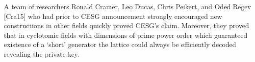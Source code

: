 A team of researchers Ronald Cramer, Leo Ducas, Chris Peikert, and Oded Regev [Cra15] who had prior to CESG announcement strongly encouraged new constructions in other fields quickly proved CESG’s claim. Moreover, they proved that in cyclotomic fields with dimensions of prime power order which guaranteed existence of a ‘short’ generator the lattice could always be efficiently decoded revealing the private key.
